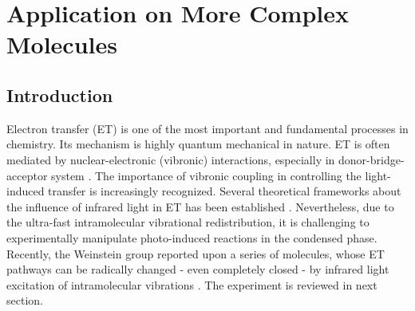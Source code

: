 \chapter{Application on More Complex Molecules}\label{chap:chapt4}
\section{Introduction}

Electron transfer (ET) is one of the most important and fundamental processes in chemistry. Its mechanism
 is highly quantum mechanical in nature. ET is often mediated by nuclear-electronic (vibronic) interactions, especially in donor-bridge-acceptor system \cite{ulstrup1975effect,schrauben2010vibrational,davis2009effect,devault1980quantum,gray1996electron,lewis2002donor,bressler2009femtosecond,shih2008tryptophan,repp2010coherent,halpin2014two}. The importance of vibronic coupling in controlling the light-induced transfer is increasingly recognized. Several theoretical frameworks about the influence of infrared light in ET has been established \cite{soler2014signature,skourtis2004inelastic,xiao2009turning,beratan2009steering,antoniou2015vibrational}. Nevertheless, due to the ultra-fast intramolecular vibrational redistribution, it is challenging to experimentally manipulate photo-induced reactions in the condensed phase. Recently, the Weinstein group reported upon a series of molecules, whose ET pathways can be radically changed - even completely closed - by infrared light excitation of intramolecular vibrations \cite{delor2014toward,delor2015mechanism,scattergood2014electron}. The experiment is reviewed in next section.

